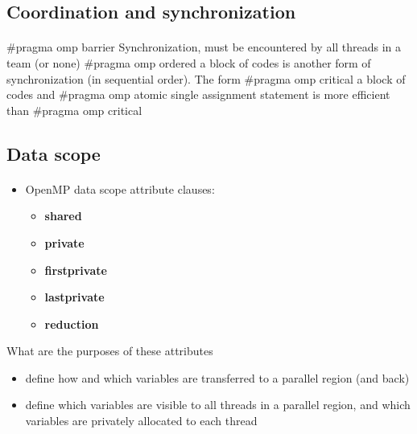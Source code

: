\documentclass[%
twoside,                 %
final,                   %
10pt]{article}
\begin{document}
\subsection{Coordination and synchronization}

\paragraph{}
\bcppcod
#pragma omp barrier
\ecppcod
Synchronization, must be encountered by all threads in a team (or none)
\bcppcod
#pragma omp ordered { a block of codes }
\ecppcod
is another form of synchronization (in sequential order).
The form
\bcppcod
#pragma omp critical { a block of codes }
\ecppcod
and 
\bcppcod
#pragma omp atomic { single assignment statement }
\ecppcod
is  more efficient than 
\bcppcod
#pragma omp critical
\ecppcod




\subsection{Data scope}

\paragraph{}
\begin{itemize}
\item OpenMP data scope attribute clauses:
\begin{itemize}

 \item \textbf{shared}

 \item \textbf{private}

 \item \textbf{firstprivate}

 \item \textbf{lastprivate}

 \item \textbf{reduction}
\end{itemize}

\noindent
\end{itemize}

\noindent
What are the purposes of these attributes
\begin{itemize}
\item define how and which variables are transferred to a parallel region (and back)

\item define which variables are visible to all threads in a parallel region, and which variables are privately allocated to each thread
\end{itemize}
\end{document}
